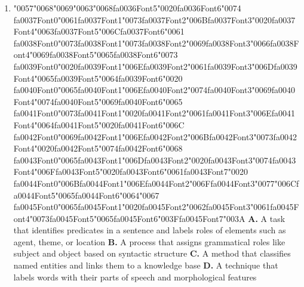 \documentclass[11pt]{article}
\begin{document}
\begin{enumerate}[leftmargin=*]
  \item {\char"0057}{\char"0068}{\char"0069}{\char"0063}{\char"0068}{\csname fa0036Font5\endcsname\char"0020}{\csname fa0036Font6\endcsname\char"0074} {\csname fa0037Font0\endcsname\char"0061}{\csname fa0037Font1\endcsname\char"0073}{\csname fa0037Font2\endcsname\char"006B}{\csname fa0037Font3\endcsname\char"0020}{\csname fa0037Font4\endcsname\char"0063}{\csname fa0037Font5\endcsname\char"006C}{\csname fa0037Font6\endcsname\char"0061} {\csname fa0038Font0\endcsname\char"0073}{\csname fa0038Font1\endcsname\char"0073}{\csname fa0038Font2\endcsname\char"0069}{\csname fa0038Font3\endcsname\char"0066}{\csname fa0038Font4\endcsname\char"0069}{\csname fa0038Font5\endcsname\char"0065}{\csname fa0038Font6\endcsname\char"0073} {\csname fa0039Font0\endcsname\char"0020}{\csname fa0039Font1\endcsname\char"006E}{\csname fa0039Font2\endcsname\char"0061}{\csname fa0039Font3\endcsname\char"006D}{\csname fa0039Font4\endcsname\char"0065}{\csname fa0039Font5\endcsname\char"0064}{\csname fa0039Font6\endcsname\char"0020} {\csname fa0040Font0\endcsname\char"0065}{\csname fa0040Font1\endcsname\char"006E}{\csname fa0040Font2\endcsname\char"0074}{\csname fa0040Font3\endcsname\char"0069}{\csname fa0040Font4\endcsname\char"0074}{\csname fa0040Font5\endcsname\char"0069}{\csname fa0040Font6\endcsname\char"0065} {\csname fa0041Font0\endcsname\char"0073}{\csname fa0041Font1\endcsname\char"0020}{\csname fa0041Font2\endcsname\char"0061}{\csname fa0041Font3\endcsname\char"006E}{\csname fa0041Font4\endcsname\char"0064}{\csname fa0041Font5\endcsname\char"0020}{\csname fa0041Font6\endcsname\char"006C} {\csname fa0042Font0\endcsname\char"0069}{\csname fa0042Font1\endcsname\char"006E}{\csname fa0042Font2\endcsname\char"006B}{\csname fa0042Font3\endcsname\char"0073}{\csname fa0042Font4\endcsname\char"0020}{\csname fa0042Font5\endcsname\char"0074}{\csname fa0042Font6\endcsname\char"0068} {\csname fa0043Font0\endcsname\char"0065}{\csname fa0043Font1\endcsname\char"006D}{\csname fa0043Font2\endcsname\char"0020}{\csname fa0043Font3\endcsname\char"0074}{\csname fa0043Font4\endcsname\char"006F}{\csname fa0043Font5\endcsname\char"0020}{\csname fa0043Font6\endcsname\char"0061}{\csname fa0043Font7\endcsname\char"0020} {\csname fa0044Font0\endcsname\char"006B}{\csname fa0044Font1\endcsname\char"006E}{\csname fa0044Font2\endcsname\char"006F}{\csname fa0044Font3\endcsname\char"0077}{\char"006C}{\csname fa0044Font5\endcsname\char"0065}{\csname fa0044Font6\endcsname\char"0064}{\char"0067} {\csname fa0045Font0\endcsname\char"0065}{\csname fa0045Font1\endcsname\char"0020}{\csname fa0045Font2\endcsname\char"0062}{\csname fa0045Font3\endcsname\char"0061}{\csname fa0045Font4\endcsname\char"0073}{\csname fa0045Font5\endcsname\char"0065}{\csname fa0045Font6\endcsname\char"003F}{\csname fa0045Font7\endcsname\char"003A}
    \textbf{A.} A task that identifies predicates in a sentence and labels roles of elements such as agent, theme, or location
    \textbf{B.} A process that assigns grammatical roles like subject and object based on syntactic structure
    \textbf{C.} A method that classifies named entities and links them to a knowledge base
    \textbf{D.} A technique that labels words with their parts of speech and morphological features


\end{enumerate}
\end{document}
